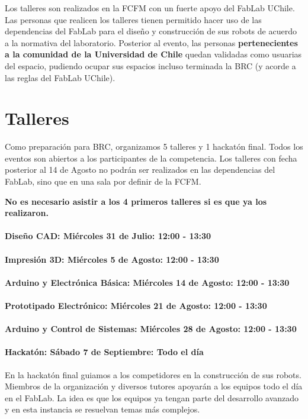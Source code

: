 Los talleres son realizados en la FCFM con un fuerte apoyo del FabLab UChile. 
Las personas que realicen los talleres tienen permitido hacer uso de las dependencias del FabLab para el diseño y construcción de sus robots de acuerdo a la normativa del laboratorio.
Posterior al evento, las personas \textbf{pertenecientes a la comunidad de la Universidad de Chile} quedan validadas como usuarias del espacio, pudiendo ocupar sus espacios incluso terminada la BRC (y acorde a las reglas del FabLab UChile).

\section{Talleres}

Como preparación para BRC, organizamos 5 talleres y 1 hackatón final.
Todos los eventos son abiertos a los participantes de la competencia.
Los talleres con fecha posterior al 14 de Agosto no podrán ser realizados en las dependencias del FabLab, sino que en una sala por definir de la FCFM.

\textbf{No es necesario asistir a los 4 primeros talleres si es que ya los realizaron.}

\paragraph*{Diseño CAD: Miércoles 31 de Julio: 12:00 - 13:30}

\paragraph*{Impresión 3D: Miércoles 5 de Agosto: 12:00 - 13:30}

\paragraph*{Arduino y Electrónica Básica: Miércoles 14 de Agosto: 12:00 - 13:30}

\paragraph*{Prototipado Electrónico: Miércoles 21 de Agosto: 12:00 - 13:30}

\paragraph*{Arduino y Control de Sistemas: Miércoles 28 de Agosto: 12:00 - 13:30}

\paragraph*{Hackatón: Sábado 7 de Septiembre: Todo el día}
En la hackatón final guiamos a los competidores en la construcción de sus robots.
Miembros de la organización y diversos tutores apoyarán a los equipos todo el día en el FabLab.
La idea es que los equipos ya tengan parte del desarrollo avanzado y en esta instancia se resuelvan temas más complejos.

